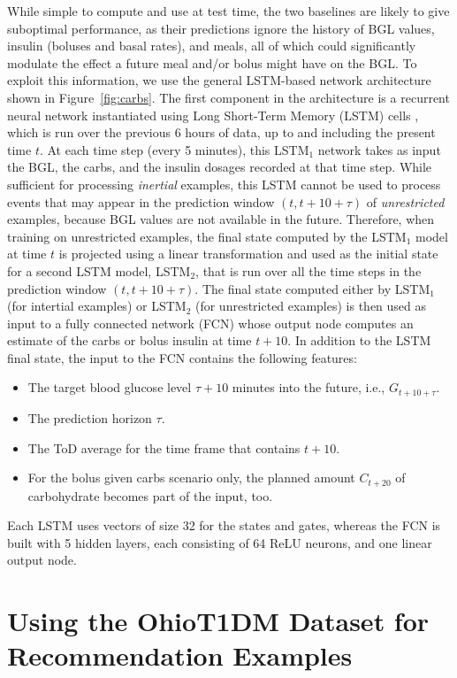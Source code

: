 \documentclass[graybox]{svmult}
\begin{document}
While simple to compute and use at test time, the two baselines are likely to give suboptimal performance, as their predictions ignore the history of BGL values, insulin (boluses and basal rates), and meals, all of which could significantly modulate the effect a future meal and/or bolus might have on the BGL. To exploit this information, we use the general LSTM-based network architecture shown in Figure~\ref{fig:carbs}. The first component in the architecture is a recurrent neural network instantiated using Long Short-Term Memory (LSTM) cells \cite{hochreiter:nc97}, which is run over the previous 6 hours of data, up to and including the present time $t$. At each time step (every 5 minutes), this LSTM$_1$ network takes as input the BGL, the carbs, and the insulin dosages recorded at that time step. While sufficient for processing {\it inertial} examples, this LSTM cannot be used to process events that may appear in the prediction window $(t, t+10+\tau)$ of {\it unrestricted} examples, because BGL values are not available in the future. Therefore, when training on unrestricted examples, the final state computed by the LSTM$_1$ model at time $t$ is projected using a linear transformation and used as the initial state for a second LSTM model, LSTM$_2$, that is run over all the time steps in the prediction window $(t, t+10+\tau)$. The final state computed either by LSTM$_1$ (for intertial examples) or LSTM$_2$ (for unrestricted examples) is then used as input to a fully connected network (FCN) whose output node computes an estimate of the carbs or bolus insulin at time $t+10$. In addition to the LSTM final state, the input to the FCN contains the following features:
\begin{itemize}
    \item The target blood glucose level $\tau+10$ minutes into the future, i.e., $G_{t + 10 + \tau}$.
    \item The prediction horizon $\tau$.
    \item The ToD average for the time frame that contains $t+10$.
    \item For the bolus given carbs scenario only, the planned amount $C_{t + 20}$ of carbohydrate becomes part of the input, too.
\end{itemize}
Each LSTM uses vectors of size 32 for the states and gates, whereas the FCN is built with 5 hidden layers, each consisting of 64 ReLU neurons, and one linear output node.

\section{Using the OhioT1DM Dataset for Recommendation Examples}
\label{sec:dataset}
\end{document}
